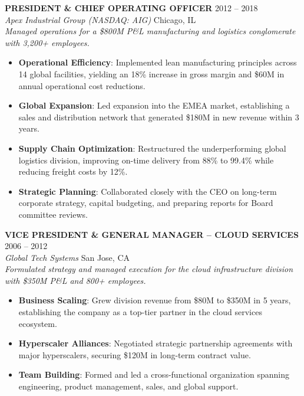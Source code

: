 \documentclass[10pt,letterpaper]{article}
\begin{document}
\noindent
\textbf{\large\color{primaryColor} PRESIDENT \& CHIEF OPERATING OFFICER} \hfill {\color{subtleColor}\small 2012 -- 2018} \\
\textit{Apex Industrial Group (NASDAQ: AIG)} \hfill {\color{subtleColor}\small Chicago, IL} \\
\vspace{3pt}
{\color{textColor}\small\textit{Managed operations for a \$800M P\&L manufacturing and logistics conglomerate with 3,200+ employees.}}
\begin{itemize}
    \item \textbf{Operational Efficiency}: Implemented lean manufacturing principles across 14 global facilities, yielding an 18\% increase in gross margin and \$60M in annual operational cost reductions.
    \item \textbf{Global Expansion}: Led expansion into the EMEA market, establishing a sales and distribution network that generated \$180M in new revenue within 3 years.
    \item \textbf{Supply Chain Optimization}: Restructured the underperforming global logistics division, improving on-time delivery from 88\% to 99.4\% while reducing freight costs by 12\%.
    \item \textbf{Strategic Planning}: Collaborated closely with the CEO on long-term corporate strategy, capital budgeting, and preparing reports for Board committee reviews.
\end{itemize}

\newpage

\noindent
\textbf{\large\color{primaryColor} VICE PRESIDENT \& GENERAL MANAGER -- CLOUD SERVICES} \hfill {\color{subtleColor}\small 2006 -- 2012} \\
\textit{Global Tech Systems} \hfill {\color{subtleColor}\small San Jose, CA} \\
\vspace{3pt}
{\color{textColor}\small\textit{Formulated strategy and managed execution for the cloud infrastructure division with \$350M P\&L and 800+ employees.}}
\begin{itemize}
    \item \textbf{Business Scaling}: Grew division revenue from \$80M to \$350M in 5 years, establishing the company as a top-tier partner in the cloud services ecosystem.
    \item \textbf{Hyperscaler Alliances}: Negotiated strategic partnership agreements with major hyperscalers, securing \$120M in long-term contract value.
    \item \textbf{Team Building}: Formed and led a cross-functional organization spanning engineering, product management, sales, and global support.
\end{itemize}
\end{document}

